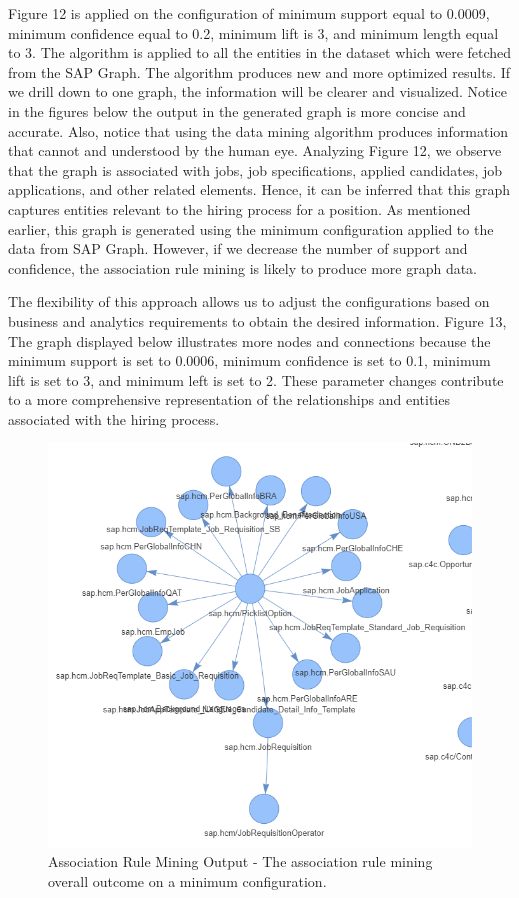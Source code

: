 \documentclass{article}
\begin{document}
Figure 12 is applied on the configuration of minimum support equal to 0.0009, minimum confidence equal to 0.2, minimum lift is 3, and minimum length equal to 3. The algorithm is applied to all the entities in the dataset which were fetched from the SAP Graph. The algorithm produces new and more optimized results. If we drill down to one graph, the information will be clearer and visualized. Notice in the figures below the output in the generated graph is more concise and accurate. Also, notice that using the data mining algorithm produces information that cannot and understood by the human eye. Analyzing Figure 12, we observe that the graph is associated with jobs, job specifications, applied candidates, job applications, and other related elements. Hence, it can be inferred that this graph captures entities relevant to the hiring process for a position. As mentioned earlier, this graph is generated using the minimum configuration applied to the data from SAP Graph. However, if we decrease the number of support and confidence, the association rule mining is likely to produce more graph data.

The flexibility of this approach allows us to adjust the configurations based on business and analytics requirements to obtain the desired information. Figure 13, The graph displayed below illustrates more nodes and connections because the minimum support is set to 0.0006, minimum confidence is set to 0.1, minimum lift is set to 3, and minimum left is set to 2. These parameter changes contribute to a more comprehensive representation of the relationships and entities associated with the hiring process.

\begin{figure}[ht!]
    \centering
    \includegraphics[scale=0.5]{ar-max-output}
    \caption{Association Rule Mining Output - 
The association rule mining overall outcome on a minimum configuration.}
    \label{fig:ea-max-ar}
\end{figure}
\end{document}
